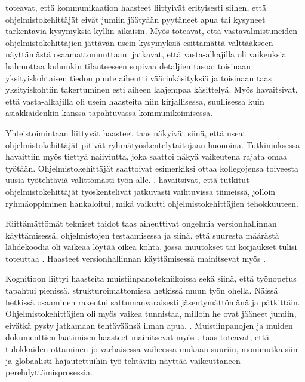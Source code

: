 \documentclass[utf8]{gradu3}
\begin{document}
\textcite{begel-simon-2008} toteavat, että kommunikaation haasteet liittyivät erityisesti siihen, että ohjelmistokehittäjät eivät jumiin jäätyään pyytäneet apua tai kysyneet tarkentavia kysymyksiä kyllin aikaisin. Myös \textcite{radermacher-ym-2015} toteavat, että vastavalmistuneiden ohjelmistokehittäjien jättävän usein kysymyksiä esittämättä välttääkseen näyttämästä osaamattomuuttaan. \textcite{begel-simon-2008} jatkavat, että vasta-alkajilla oli vaikeuksia hahmottaa kuhunkin tilanteeseen sopivaa detaljien tasoa: toisinaan yksityiskohtaisen tiedon puute aiheutti väärinkäsityksiä ja toisinaan taas yksityiskohtiin takertuminen esti aiheen laajempaa käsittelyä. Myös \textcite{radermacher-ym-2015} havaitsivat, että vasta-alkajilla oli usein haasteita niin kirjallisessa, suullisessa kuin asiakkaidenkin kanssa tapahtuvassa kommunikoimisessa.

Yhteistoimintaan liittyvät haasteet taas näkyivät siinä, että useat ohjelmistokehittäjät pitivät ryhmätyöskentelytaitojaan huonoina. Tutkimuksessa havaittiin myös tiettyä naiiviutta, joka saattoi näkyä vaikeutena rajata omaa työtään. Ohjelmistokehittäjät saattoivat esimerkiksi ottaa kollegojensa toiveesta uusia työtehtäviä välittömästi työn alle. \parencite{begel-simon-2008}. \textcite{britto-ym-2019} havaitsivat, että tutkitut ohjelmistokehittäjät työskentelivät jatkuvasti vaihtuvissa tiimeissä, jolloin ryhmäoppiminen hankaloitui, mikä vaikutti ohjelmistokehittäjien tehokkuuteen.

Riittämättömät tekniset taidot taas aiheuttivat ongelmia versionhallinnan käyttämisessä, ohjelmistojen testaamisessa ja siinä, että suuresta määrästä lähdekoodia oli vaikeaa löytää oikea kohta, jossa muutokset tai korjaukset tulisi toteuttaa \parencite{begel-simon-2008}. Haasteet versionhallinnan käyttämisessä mainitsevat myös \textcite{radermacher-ym-2015}.

Kognitioon liittyi haasteita muistiinpanotekniikoissa sekä siinä, että työnopetus tapahtui pienissä, strukturoimattomissa hetkissä muun työn ohella. Näissä hetkissä osaaminen rakentui sattumanvaraisesti jäsentymättömänä ja pätkittäin. Ohjelmistokehittäjien oli myös vaikea tunnistaa, milloin he ovat jääneet jumiin, eivätkä pysty jatkamaan tehtäväänsä ilman apua. \parencite{begel-simon-2008}. Muistiinpanojen ja muiden dokumenttien laatimisen haasteet mainitsevat myös \textcite{radermacher-ym-2015}. \textcite{britto-ym-2019} taas toteavat, että tulokkaiden ottaminen jo varhaisessa vaiheessa mukaan suuriin, monimutkaisiin ja globaalisti hajautettuihin työ tehtäviin näyttää vaikeuttaneen perehdyttämisprosessia.
\end{document}
